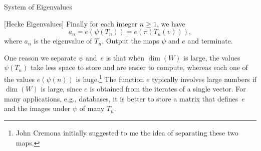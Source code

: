 \begin{algorithm}{System of Eigenvalues}
\begin{steps}
\item{}[Hecke Eigenvalues] Finally for each integer
$n\geq 1$, we have
$$       
          a_n = e(\psi(T_n)) = e(\pi(T_n(v))),
$$        
where $a_n$ is the eigenvalue of $T_n$.
Output the maps $\psi$ and $e$ and terminate. 
\end{steps}
\end{algorithm}

One reason we separate $\psi$ and~$e$ is that when $\dim(W)$ is large,
the values $\psi(T_n)$ take less space to store and are easier to
compute, whereas each one of the values $e(\psi(n))$ is
huge.\footnote{John Cremona initially suggested to me the idea of
  separating these two maps.}  The function $e$ typically involves
large numbers if $\dim(W)$ is large, since $e$ is obtained from the
iterates of a single vector.  For many applications, e.g., databases,
it is better to store a matrix that defines~$e$ and the images under
$\psi$ of many $T_n$.





